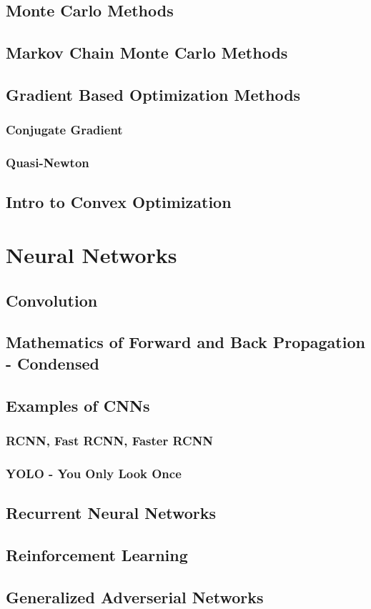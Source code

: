 \documentclass[12pt]{article}
\begin{document}
    \subsection{Monte Carlo Methods}
    \subsection{Markov Chain Monte Carlo Methods}
    \subsection{Gradient Based Optimization Methods}
        \subsubsection{Conjugate Gradient}
        \subsubsection{Quasi-Newton}
    \subsection{Intro to Convex Optimization}

\newpage

\section{Neural Networks} %
    \subsection{Convolution}
    \subsection{Mathematics of Forward and Back Propagation - Condensed}
    \subsection{Examples of CNNs}
        \subsubsection{RCNN, Fast RCNN, Faster RCNN}
        \subsubsection{YOLO - You Only Look Once}
    \subsection{Recurrent Neural Networks}
    \subsection{Reinforcement Learning} %
    \subsection{Generalized Adverserial Networks}
\end{document}
